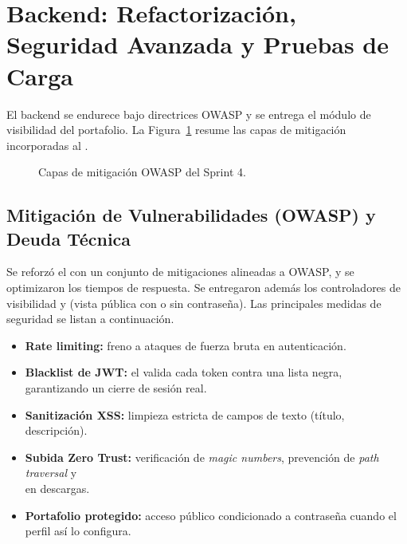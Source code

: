 \section{Backend: Refactorización, Seguridad Avanzada y Pruebas de Carga}
\label{sec:s4_backend}

El backend se endurece bajo directrices OWASP y se entrega el módulo de visibilidad del
portafolio. La Figura~\ref{fig:s4_owasp} resume las capas de mitigación incorporadas al
.\par

\begin{figure}[!ht]
    \centering
    \caption{Capas de mitigación OWASP del Sprint 4.}
    \label{fig:s4_owasp}
\end{figure}

\subsection{Mitigación de Vulnerabilidades (OWASP) y Deuda Técnica}
\label{ssec:s4_be_owasp}
Se reforzó el  con un conjunto de mitigaciones alineadas a OWASP, y se
optimizaron los tiempos de respuesta. Se entregaron además los controladores de visibilidad
 y  (vista pública con o
sin contraseña). Las principales medidas de seguridad se listan a continuación.

\begin{itemize}[noitemsep]
    \item \textbf{Rate limiting:} freno a ataques de fuerza bruta en autenticación.
    \item \textbf{Blacklist de JWT:} el  valida cada token
    contra una lista negra, garantizando un cierre de sesión real.
    \item \textbf{Sanitización XSS:} limpieza estricta de campos de texto (título, descripción).
    \item \textbf{Subida Zero Trust:} verificación de \textit{magic numbers}, prevención de
    \textit{path traversal} y \\  en descargas.
    \item \textbf{Portafolio protegido:} acceso público condicionado a contraseña cuando el
    perfil así lo configura.
\end{itemize}


